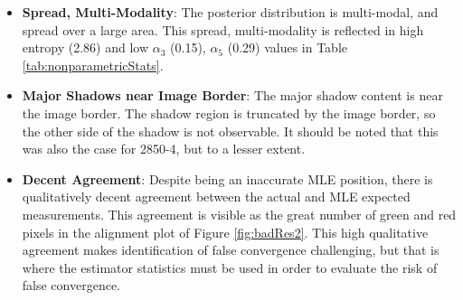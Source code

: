 \begin{itemize}
\item \textbf{Spread, Multi-Modality}: The posterior distribution is multi-modal, and spread over a large area. This spread, multi-modality is reflected in high entropy (2.86) and low $\alpha_3$ (0.15), $\alpha_5$ (0.29) values in Table \ref{tab:nonparametricStats}.
\item \textbf{Major Shadows near Image Border}: The major shadow content is near the image border. The shadow region is truncated by the image border, so the other side of the shadow is not observable.  It should be noted that this was also the case for 2850-4, but to a lesser extent.
\item \textbf{Decent Agreement}: Despite being an inaccurate MLE position, there is qualitatively decent agreement between the actual and MLE expected measurements.  This agreement is visible as the great number of green and red pixels in the alignment plot of Figure \ref{fig:badRes2}. This high qualitative agreement makes identification of false convergence challenging, but that is where the estimator statistics must be used in order to evaluate the risk of false convergence.
\end{itemize}

